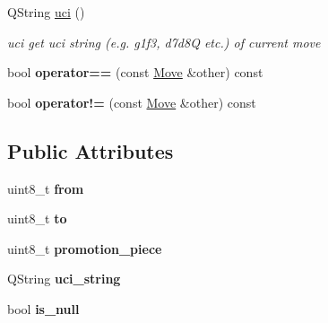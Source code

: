 \begin{DoxyCompactItemize}
\item 
Q\-String \hyperlink{classchess_1_1Move_a808b107f197231153d98d10251d9096e}{uci} ()
\begin{DoxyCompactList}\small\item\em uci get uci string (e.\-g. g1f3, d7d8\-Q etc.) of current move \end{DoxyCompactList}\item 
\hypertarget{classchess_1_1Move_aafc06139dc4aa8ab46cd7edd0bfb44dd}{bool {\bfseries operator==} (const \hyperlink{classchess_1_1Move}{Move} \&other) const }\label{classchess_1_1Move_aafc06139dc4aa8ab46cd7edd0bfb44dd}

\item 
\hypertarget{classchess_1_1Move_a9578fdf68e54b3e3f645c06193e284e5}{bool {\bfseries operator!=} (const \hyperlink{classchess_1_1Move}{Move} \&other) const }\label{classchess_1_1Move_a9578fdf68e54b3e3f645c06193e284e5}

\end{DoxyCompactItemize}
\subsection*{Public Attributes}
\begin{DoxyCompactItemize}
\item 
\hypertarget{classchess_1_1Move_a8f8469b837fff9baad07e0dd572bbb1b}{uint8\-\_\-t {\bfseries from}}\label{classchess_1_1Move_a8f8469b837fff9baad07e0dd572bbb1b}

\item 
\hypertarget{classchess_1_1Move_a0a754e25cda786475b39e8d53a484740}{uint8\-\_\-t {\bfseries to}}\label{classchess_1_1Move_a0a754e25cda786475b39e8d53a484740}

\item 
\hypertarget{classchess_1_1Move_a7ebe3729053a5a9db82f4d74564cb7dc}{uint8\-\_\-t {\bfseries promotion\-\_\-piece}}\label{classchess_1_1Move_a7ebe3729053a5a9db82f4d74564cb7dc}

\item 
\hypertarget{classchess_1_1Move_ae69eda740543725180831fb5f76ea87d}{Q\-String {\bfseries uci\-\_\-string}}\label{classchess_1_1Move_ae69eda740543725180831fb5f76ea87d}

\item 
\hypertarget{classchess_1_1Move_a7eed53bc8f23dedc3baf77f66c57b2e6}{bool {\bfseries is\-\_\-null}}\label{classchess_1_1Move_a7eed53bc8f23dedc3baf77f66c57b2e6}

\end{DoxyCompactItemize}
